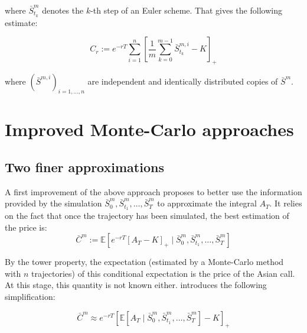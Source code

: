 \documentclass{article}
\begin{document}
where $\bar S_{t_k}^m$ denotes the $k$-th step of an Euler scheme. That gives the following estimate:

\begin{equation}
	C_r := e^{-rT} \sum_{i=1}^n \left[ \frac{1}{m} \sum_{k=0}^{m-1} \bar S_{t_k}^{m, i} - K \right]_+
	\tag{1}
\end{equation}

where $\left( \bar S^{m, i} \right)_{i = 1, \dots, n}$ are independent and identically distributed copies of $\bar S^m$.

\section{Improved Monte-Carlo approaches}
\subsection{Two finer approximations}

A first improvement of the above approach proposes to better use the information provided by the simulation
$\bar S_0^m, \bar S_{t_1}^m, \dots, \bar S_T^m$ to approximate the integral $A_T$.
It relies on the fact that once the trajectory has been simulated, the best estimation of the price is:
\[
	\bar C^m := \mathbb E \left[ e^{-rT} \left[ A_T - K \right]_+ \mid \bar S_0^m, \bar S_{t_1}^m, \dots, \bar S_T^m \right]
\]

By the tower property, the expectation (estimated by a Monte-Carlo method with $n$ trajectories)
of this conditional expectation is the price of the Asian call.
At this stage, this quantity is not known either. \cite{main} introduces the following simplification:

\begin{equation}
	\bar C^m \approx e^{-rT}  \left[ \mathbb E \left[A_T
		\mid \bar S_0^m, \bar S_{t_1}^m, \dots, \bar S_T^m \right] - K \right]_+
	\tag{S}
\end{equation}
\end{document}

